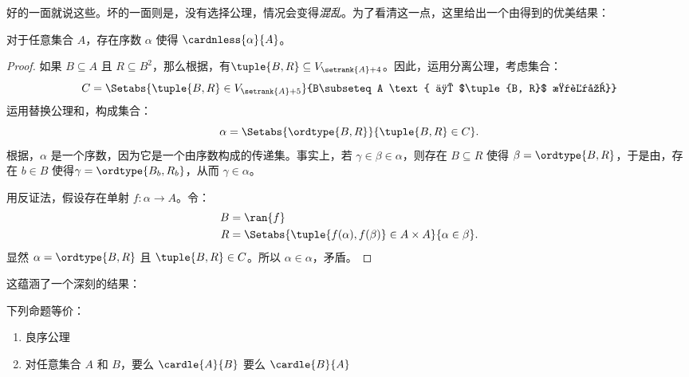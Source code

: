 \documentclass[../../../include/open-logic-section]{subfiles}
\begin{document}

好的一面就说这些。坏的一面则是，没有选择公理，情况会变得\emph{混乱}。为了看清这一点，这里给出一个由\cite{Hartogs1915}得到的优美结果：

\begin{lem}[\emph{在 $\ZF$ 中}]
对于任意集合 $A$，存在序数 $\alpha$ 使得 $\cardnless{\alpha}{A}$。
\end{lem}

\begin{proof}
如果 $B \subseteq A$ 且 $R \subseteq B^2$，那么根据，有$\tuple{B, R} \subseteq
V_{\setrank{A}+4}$。因此，运用分离公理，考虑集合：
\[
	C = \Setabs{\tuple{B, R} \in V_{\setrank{A}+5}}{B\subseteq A
	\text{ 且 $\tuple{B, R}$ 是良序}}
\]
运用替换公理和，构成集合：
\[
	\alpha = \Setabs{\ordtype{B, R}}{\tuple{B, R} \in C}.
\]
根据，$\alpha$ 是一个序数，因为它是一个由序数构成的传递集。事实上，若 $\gamma \in \beta \in \alpha$，则存在 $B \subseteq R$ 使得 $\beta = \ordtype{B, R}$，于是由，存在 $b \in B$ 使得$\gamma = \ordtype{B_b, R_b}$，从而 $\gamma \in \alpha$。

用反证法，假设存在单射 $f \colon \alpha \to A$。令：
\begin{align*}
	B &= \ran{f}\\
	R &= \Setabs{\tuple{f(\alpha), f(\beta)} \in A \times A}{\alpha \in \beta}.
\end{align*}
显然 $\alpha = \ordtype{B, R}$ 且 $\tuple{B, R} \in C$。所以 $\alpha \in \alpha$，矛盾。
\end{proof}

这蕴涵了一个深刻的结果：

\begin{thm}[\emph{在 $\ZF$ 中}]
下列命题等价：
\begin{enumerate}
	\item{} 良序公理
	\item{} 对任意集合 $A$ 和 $B$，要么 $\cardle{A}{B}$ 要么 $\cardle{B}{A}$
\end{enumerate}
\end{thm}
\end{document}

